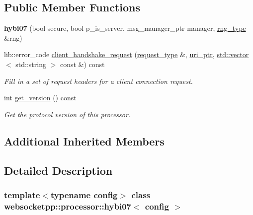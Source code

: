 \subsection*{Public Member Functions}
\begin{DoxyCompactItemize}
\item 
\mbox{\label{classwebsocketpp_1_1processor_1_1hybi07_a1e77a4eb4842277d510fd761fea40b0f}} 
{\bfseries hybi07} (bool secure, bool p\+\_\+is\+\_\+server, msg\+\_\+manager\+\_\+ptr manager, \mbox{\hyperlink{classwebsocketpp_1_1random_1_1none_1_1int__generator}{rng\+\_\+type}} \&rng)
\item 
lib\+::error\+\_\+code \mbox{\hyperlink{classwebsocketpp_1_1processor_1_1hybi07_a9742c622a7b1b5d54daa03a2fe0b060b}{client\+\_\+handshake\+\_\+request}} (\mbox{\hyperlink{classwebsocketpp_1_1http_1_1parser_1_1request}{request\+\_\+type}} \&, \mbox{\hyperlink{namespacewebsocketpp_aae370ea5ac83a8ece7712cb39fc23f5b}{uri\+\_\+ptr}}, \mbox{\hyperlink{classstd_1_1vector}{std\+::vector}}$<$ std\+::string $>$ const \&) const
\begin{DoxyCompactList}\small\item\em Fill in a set of request headers for a client connection request. \end{DoxyCompactList}\item 
\mbox{\label{classwebsocketpp_1_1processor_1_1hybi07_a8274e10147072c358a282d43cdcb264d}} 
int \mbox{\hyperlink{classwebsocketpp_1_1processor_1_1hybi07_a8274e10147072c358a282d43cdcb264d}{get\+\_\+version}} () const
\begin{DoxyCompactList}\small\item\em Get the protocol version of this processor. \end{DoxyCompactList}\end{DoxyCompactItemize}
\subsection*{Additional Inherited Members}


\subsection{Detailed Description}
\subsubsection*{template$<$typename config$>$\newline
class websocketpp\+::processor\+::hybi07$<$ config $>$}

